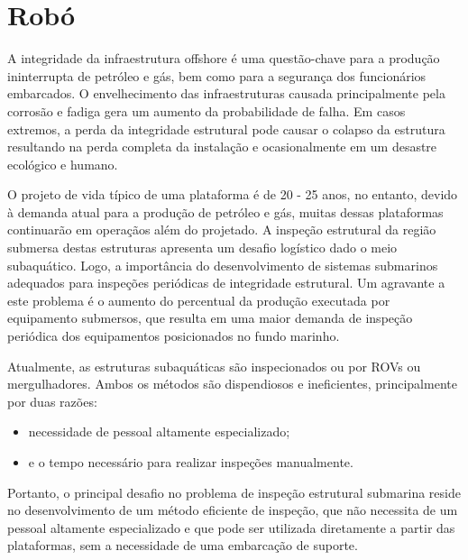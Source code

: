\chapter{Robó}
\label{chap:robaqua}
A integridade da infraestrutura offshore é uma questão-chave para a produção ininterrupta de petróleo e gás, bem como para a segurança dos funcionários embarcados. O envelhecimento das infraestruturas causada principalmente pela corrosão e fadiga gera um aumento da probabilidade de falha. Em casos extremos, a perda da integridade estrutural pode causar o colapso da estrutura resultando na perda completa da instalação e ocasionalmente em um desastre ecológico e humano. 

O projeto de vida típico de uma plataforma é de 20 - 25 anos, no entanto, devido à demanda atual para a produção de petróleo e gás, muitas dessas plataformas continuarão em operaçãos além do projetado. A inspeção estrutural da região submersa destas estruturas apresenta um desafio logístico dado o meio subaquático. Logo, a importância do desenvolvimento de sistemas submarinos adequados para inspeções periódicas de integridade estrutural. Um agravante a este problema é o aumento do percentual da produção executada por equipamento submersos, que resulta em uma maior demanda de inspeção periódica dos equipamentos posicionados no fundo marinho.  

Atualmente, as estruturas subaquáticas são inspecionados ou por ROVs ou mergulhadores. Ambos os métodos são dispendiosos e ineficientes, principalmente por duas razões: 
\begin{itemize}
	\item necessidade de pessoal altamente especializado;
	\item e o tempo necessário para realizar inspeções manualmente.
\end{itemize}

Portanto, o principal desafio no problema de inspeção estrutural submarina reside no desenvolvimento de um método eficiente de inspeção, que não necessita de um pessoal altamente especializado e que pode ser utilizada diretamente a partir das plataformas, sem a necessidade de uma embarcação de suporte.  


%
%
%

